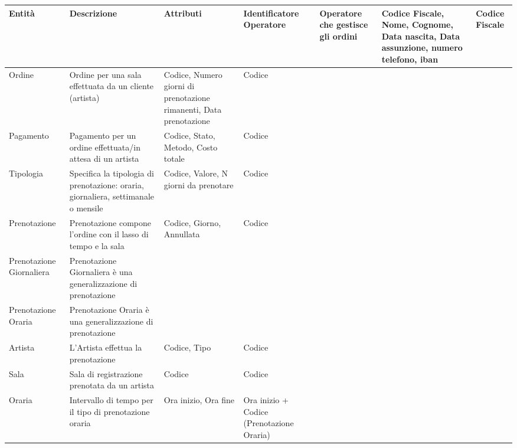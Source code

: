 \documentclass{article}
\begin{document}
\renewcommand*{\arraystretch}{1.4}
\begin{longtable}{|p{.15\linewidth}|p{.25\linewidth}|p{.25\linewidth}|p{.15\linewidth}|}
    \hline
    \textbf{Entità} & \textbf{Descrizione} & \textbf{Attributi} & \textbf{Identificatore} 
    \endhead 
    \hline
    Operatore & Operatore che gestisce gli ordini & Codice Fiscale, Nome, Cognome, Data nascita, Data assunzione, numero telefono, iban & Codice Fiscale \\ \hline
    Ordine & Ordine per una sala effettuata da un cliente (artista) & Codice, Numero giorni di prenotazione rimanenti, Data  prenotazione & Codice  \\ \hline
    Pagamento & Pagamento per un ordine effettuata/in attesa di un artista & Codice, Stato, Metodo, Costo totale & Codice\\ \hline
    Tipologia & Specifica la tipologia di prenotazione: oraria, giornaliera, settimanale o mensile & Codice, Valore, N giorni da prenotare & Codice \\ \hline
    Prenotazione & Prenotazione compone l'ordine con il lasso di tempo e la sala & Codice, Giorno, Annullata & Codice \\ \hline
    Prenotazione Giornaliera & Prenotazione Giornaliera è una generalizzazione di prenotazione & & \\ \hline
    Prenotazione Oraria & Prenotazione Oraria è una generalizzazione di prenotazione & & \\ \hline
    Artista & L'Artista effettua la prenotazione & Codice, Tipo & Codice \\ \hline
    Sala & Sala di registrazione prenotata da un artista & Codice & Codice \\ \hline
    Oraria & Intervallo di tempo per il tipo di prenotazione oraria & Ora inizio, Ora fine & Ora inizio + Codice (Prenotazione Oraria) \\ \hline 
\end{longtable}
\end{document}
